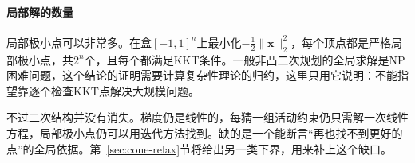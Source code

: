 \paragraph{局部解的数量}
局部极小点可以非常多。在盒$[-1,1]^n$上最小化$-\frac12\lVert\bm{x}\rVert_2^2$，每个顶点都是严格局部极小点，共$2^n$个，且每个都满足KKT条件。一般非凸二次规划的全局求解是NP困难问题，这个结论的证明需要计算复杂性理论的归约，这里只用它说明：不能指望靠逐个检查KKT点解决大规模问题。

不过二次结构并没有消失。梯度仍是线性的，每猜一组活动约束仍只需解一次线性方程，局部极小点仍可以用迭代方法找到。缺的是一个能断言“再也找不到更好的点”的全局依据。第~\ref{sec:cone-relax}节将给出另一类下界，用来补上这个缺口。
